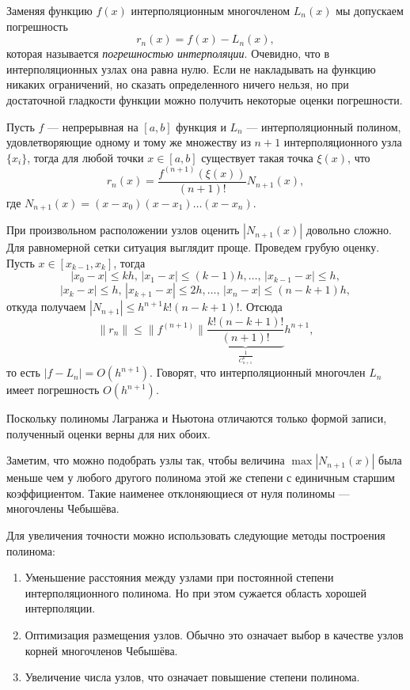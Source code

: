 
Заменяя функцию $f(x)$ интерполяционным многочленом $L_{n}(x)$ мы
допускаем погрешность
\[
r_{n}(x)=f(x)-L_{n}(x),
\]
которая называется \emph{погрешностью интерполяции}. Очевидно, что в
интерполяционных узлах она равна нулю. Если не накладывать на функцию
никаких ограничений, но сказать определенного ничего нельзя, но при
достаточной гладкости функции можно получить некоторые оценки
погрешности.

Пусть $f$ --- непрерывная на $[a,b]$ функция и $L_{n}$ ---
интерполяционный полином, удовлетворяющие одному и тому же множеству
из $n+1$ интерполяционного узла $\{x_{i}\}$, тогда для любой точки
$x\in[a,b]$ существует такая точка $\xi(x)$, что
\[
r_{n}(x)=\frac{f^{(n+1)}\left(\xi(x)\right)}{(n+1)!}N_{n+1}(x),
\]
где $N_{n+1}(x)=(x-x_{0})(x-x_{1})\dots(x-x_{n})$.

При произвольном расположении узлов оценить $|N_{n+1}(x)|$ довольно
сложно. Для равномерной сетки ситуация выглядит проще. Проведем грубую
оценку. Пусть $x\in[x_{k-1},x_{k}]$, тогда
\[
|x_{0}-x|\leqslant kh,\,|x_{1}-x|\leqslant(k-1)h,\dots,\,|x_{k-1}-x|\leqslant h,
\]
\[
|x_{k}-x|\leqslant h,\,|x_{k+1}-x|\leqslant2h,\dots,\,|x_{n}-x|\leqslant(n-k+1)h,
\]
откуда получаем $|N_{n+1}|\leqslant h^{n+1}k!(n-k+1)!$. Отсюда
\[
\|r_{n}\|\leqslant\|f^{(n+1)}\|\underset{\frac{1}{C_{n+1}^{k}}}{\underbrace{\frac{k!(n-k+1)!}{(n+1)!}}}h^{n+1},
\]
то есть $|f-L_{n}|=O(h^{n+1})$. Говорят, что интерполяционный многочлен
$L_{n}$ имеет погрешность $O(h^{n+1})$.

Поскольку полиномы Лагранжа и Ньютона отличаются только формой записи,
полученный оценки верны для них обоих.

Заметим, что можно подобрать узлы так, чтобы величина
$\max|N_{n+1}(x)|$ была меньше чем у любого другого полинома этой же
степени с единичным старшим коэффициентом. Такие наименее
отклоняющиеся от нуля полиномы --- многочлены Чебышёва.

Для увеличения точности можно использовать следующие методы построения
полинома:
\begin{enumerate}
\item Уменьшение расстояния между узлами при постоянной степени интерполяционного
полинома. Но при этом сужается область хорошей интерполяции.
\item Оптимизация размещения узлов. Обычно это означает выбор в
  качестве узлов корней многочленов Чебышёва.
\item Увеличение числа узлов, что означает повышение степени полинома.
\end{enumerate}

